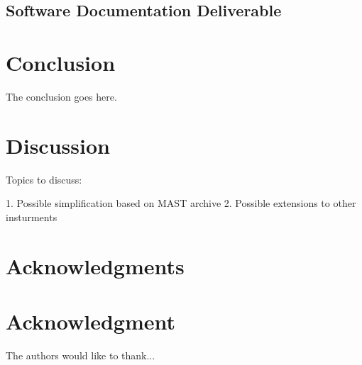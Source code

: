 \documentclass[10pt,journal,compsoc]{IEEEtran}
\begin{document}
\subsection{Software Documentation Deliverable}


\section{Conclusion}\label{sec:conclusion}
The conclusion goes here.

\section{Discussion}\label{sec:discussion}
Topics to discuss:

1. Possible simplification based on MAST archive
2. Possible extensions to other insturments

\ifCLASSOPTIONcompsoc
  \section*{Acknowledgments}
\else
  \section*{Acknowledgment}
\fi
  The authors would like to thank...


\ifCLASSOPTIONcaptionsoff
  \newpage
\fi
\end{document}
